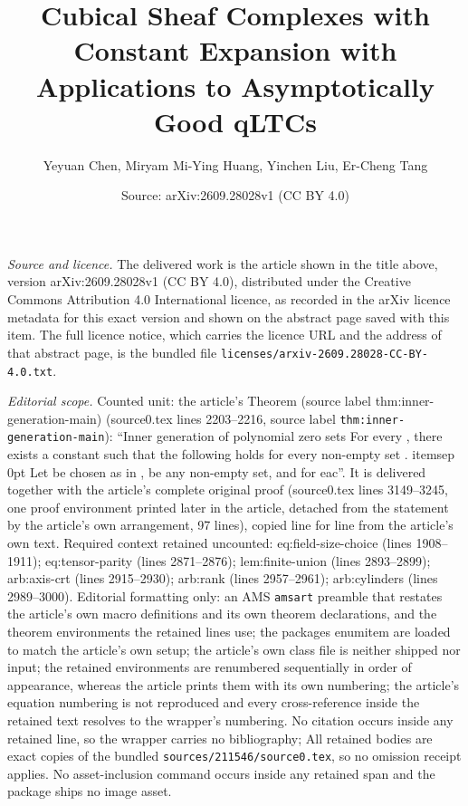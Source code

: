 \documentclass[10pt,a4paper]{amsart}
\title[Cubical Sheaf Complexes with Constant Expansion with Applications to Asymptotically Good qLTCs]{Cubical Sheaf Complexes with Constant Expansion with Applications to Asymptotically Good qLTCs}
\author{Yeyuan Chen, Miryam Mi-Ying Huang, Yinchen Liu, Er-Cheng Tang}
\date{Source: arXiv:2609.28028v1 (CC BY 4.0)}
\theoremstyle{plain}
\theoremstyle{definition}
\theoremstyle{remark}
\begin{document}
\maketitle

\noindent\emph{Source and licence.} The delivered work is the article shown in the title above, version arXiv:2609.28028v1 (CC BY 4.0), distributed under the Creative Commons Attribution 4.0 International licence, as recorded in the arXiv licence metadata for this exact version and shown on the abstract page saved with this item. The full licence notice, which carries the licence URL and the address of that abstract page, is the bundled file \texttt{licenses/arxiv-2609.28028-CC-BY-4.0.txt}.
\par\smallskip

\noindent\textit{Editorial scope.} Counted unit: the article's Theorem (source label thm:inner-generation-main) (source0.tex lines 2203--2216, source label \texttt{thm:inner-generation-main}): ``Inner generation of polynomial zero sets For every , there exists a constant such that the following holds for every non-empty set . itemsep 0pt Let be chosen as in , be any non-empty set, and for eac''. It is delivered together with the article's complete original proof (source0.tex lines 3149--3245, one proof environment printed later in the article, detached from the statement by the article's own arrangement, 97 lines), copied line for line from the article's own text. Required context retained uncounted: eq:field-size-choice (lines 1908--1911); eq:tensor-parity (lines 2871--2876); lem:finite-union (lines 2893--2899); arb:axis-crt (lines 2915--2930); arb:rank (lines 2957--2961); arb:cylinders (lines 2989--3000). Editorial formatting only: an AMS \texttt{amsart} preamble that restates the article's own macro definitions and its own theorem declarations, and the theorem environments the retained lines use; the packages enumitem are loaded to match the article's own setup; the article's own class file is neither shipped nor input; the retained environments are renumbered sequentially in order of appearance, whereas the article prints them with its own numbering; the article's equation numbering is not reproduced and every cross-reference inside the retained text resolves to the wrapper's numbering. No citation occurs inside any retained line, so the wrapper carries no bibliography; All retained bodies are exact copies of the bundled \texttt{sources/211546/source0.tex}, so no omission receipt applies. No asset-inclusion command occurs inside any retained span and the package ships no image asset.
\end{document}

